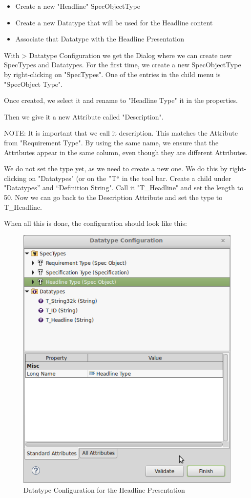 \begin{itemize}

\item
  Create a new "Headline" SpecObjectType
\item
  Create a new Datatype that will be used for the Headline content
\item
  Associate that Datatype with the Headline Presentation
\end{itemize}

With \pror{} \textgreater{} Datatype Configuration we get the Dialog where we can create new SpecTypes and Datatypes.  For the first time, we create a new SpecObjectType by right-clicking on "SpecTypes".  One of the entries in the child menu is "SpecObject Type".

Once created, we select it and rename to "Headline Type" it in the properties.

Then we give it a new Attribute called "Description".

NOTE: It is important that we call it description.  This matches the Attribute from "Requirement Type".  By using the same name, we ensure that the Attributes appear in the same column, even though they are different Attributes.

We do not set the type yet, as we need to create a new one.  We do this by right-clicking on "Datatypes" (or on the ''T`` in the tool bar.  Create a child under "Datatypes'' and  ``Definition String".  Call it "T\_Headline" and set the length to 50.  Now we can go back to the Description Attribute and set the type to T\_Headline.

When all this is done, the configuration should look like this:

\begin{figure}[h!]
\centering      
\includegraphics[width=0.8\linewidth]{../rmf-images/datatype_Headline_desc.png}      
\caption{Datatype Configuration for the Headline Presentation}      
\label{fig:headlineConfig}
\end{figure}

